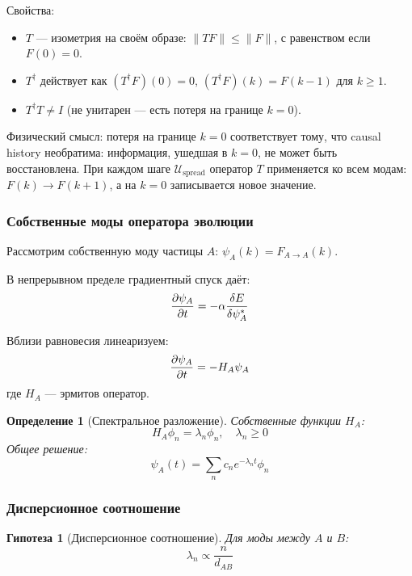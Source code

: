 \documentclass[12pt,a4paper]{article}
\newtheorem{definition}{Определение}[section]
\newtheorem{hypothesis}{Гипотеза}[section]
\begin{document}
Свойства:
\begin{itemize}
    \item $T$ --- изометрия на своём образе: $\|T F\| \leq \|F\|$, с равенством если $F(0) = 0$.
    \item $T^\dagger$ действует как $(T^\dagger F)(0) = 0$, $(T^\dagger F)(k) = F(k-1)$ для $k \geq 1$.
    \item $T^\dagger T \neq I$ (не унитарен --- есть потеря на границе $k=0$).
\end{itemize}

Физический смысл: потеря на границе $k=0$ соответствует тому, что causal history необратима: информация, ушедшая в $k=0$, не может быть восстановлена. При каждом шаге $\mathcal{U}_{\text{spread}}$ оператор $T$ применяется ко всем модам: $F(k) \to F(k+1)$, а на $k=0$ записывается новое значение.

\subsubsection{Собственные моды оператора эволюции}

Рассмотрим собственную моду частицы $A$: $\psi_A(k) = F_{A \to A}(k)$.

В непрерывном пределе градиентный спуск даёт:
\begin{equation}
    \pdv{\psi_A}{t} = -\alpha \frac{\delta E}{\delta \psi_A^*}
\end{equation}

Вблизи равновесия линеаризуем:
\begin{equation}
    \pdv{\psi_A}{t} = -H_A \psi_A
\end{equation}
где $H_A$ --- эрмитов оператор.

\begin{definition}[Спектральное разложение]
Собственные функции $H_A$:
\begin{equation}
    H_A \phi_n = \lambda_n \phi_n, \quad \lambda_n \geq 0
\end{equation}
Общее решение:
\begin{equation}
    \psi_A(t) = \sum_n c_n e^{-\lambda_n t} \phi_n
\end{equation}
\end{definition}

\subsubsection{Дисперсионное соотношение}

\begin{hypothesis}[Дисперсионное соотношение]
Для моды между $A$ и $B$:
\begin{equation}
    \lambda_n \propto \frac{n}{d_{AB}}
\end{equation}
\end{hypothesis}
\end{document}
